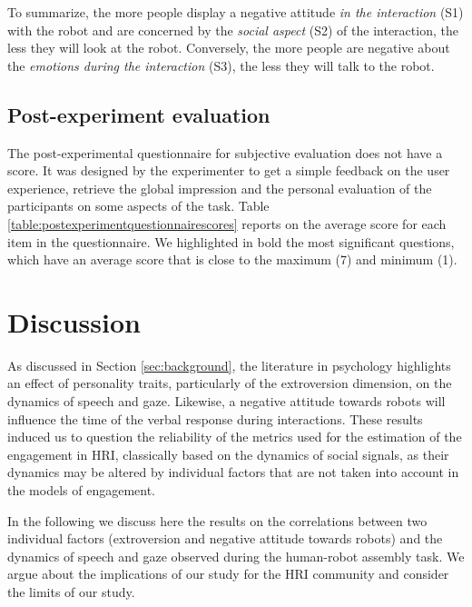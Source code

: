 To summarize, the more people display a negative attitude \textit{in the interaction} (S1) with the robot and are concerned by the \textit{social aspect} (S2) of the interaction, the less they will look at the robot. Conversely, the more people are negative about the \textit{emotions during the interaction} (S3), the less they will talk to the robot.



\subsection{Post-experiment evaluation}

The post-experimental questionnaire for subjective evaluation does not have a score. 
It was designed by the experimenter to get a simple feedback on the user experience, retrieve the global impression and the personal evaluation of the participants on some aspects of the task.
Table \ref{table:postexperimentquestionnairescores} reports on the average score for each item in the questionnaire. We highlighted in bold the most significant questions, which have an average score that is close to the maximum (7) and minimum (1).





\section{Discussion}



As discussed in Section \ref{sec:background}, the literature in psychology highlights an effect of personality traits, particularly of the extroversion dimension, on the dynamics of speech and gaze. Likewise, a negative attitude towards robots will influence the time of the verbal response during interactions.
These results induced us to question the reliability of the metrics used for the estimation of the engagement in HRI, classically based on the dynamics of social signals, as their dynamics may be altered by individual factors that are not taken into account in the models of engagement.

In the following we discuss here the results on the correlations between two individual factors (extroversion and negative attitude towards robots) and the dynamics of speech and gaze observed during the human-robot assembly task. We argue about the implications of our study for the HRI community and consider the limits of our study. 


